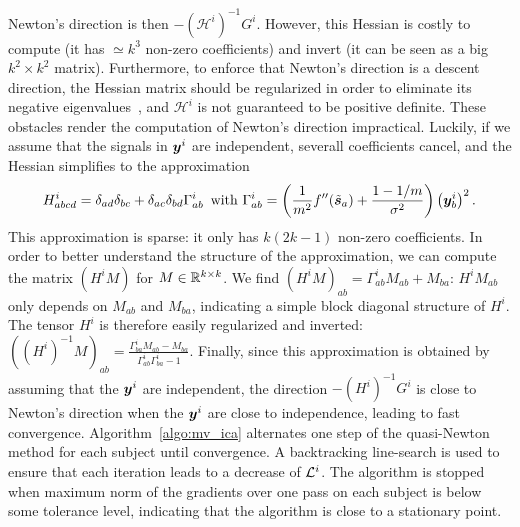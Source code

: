 Newton's direction is then $-\left(\mathcal{H}^i\right)^{-1}G^i$. However, this Hessian is costly to compute (it has $\simeq k^3$ non-zero coefficients) and invert (it can be seen as a big $k ^2\times k^2$ matrix). Furthermore, to enforce that Newton's direction is a descent direction, the Hessian matrix should be regularized in order to eliminate its negative eigenvalues~\cite{nocedal2006numerical}, and $\mathcal{H}^i$ is not guaranteed to be positive definite.
%
These obstacles render the computation of Newton's direction impractical.
%
Luckily, if we assume that the signals in $\boldsymbol{y}^i$ are independent, severall coefficients cancel, and the Hessian simplifies to the approximation
\begin{equation}
    \label{eq:hessian_approx}
    H^i_{abcd} = \delta_{ad}\delta_{bc} + \delta_{ac}\delta_{bd}\Gamma^i_{ab}\enspace \text{with  }\Gamma^i_{ab} = \left(\frac{1}{m^2}f''(\tilde{\boldsymbol{s}}_a) + \frac{1 - 1/m}{\sigma^2}\right)\left(\boldsymbol{y}^i_{b}\right)^2.
\end{equation}
This approximation is sparse: it only has $k(2k -1)$ non-zero coefficients.
%
In order to better understand the structure of the approximation, we can compute the matrix $\left(H^iM\right)$ for $M\in \mathbb{R}^{k\times k}$. 
%
We find $\left(H^iM\right)_{ab} = \Gamma^i_{ab}M_{ab} + M_{ba}$: $H^iM_{ab}$ only depends on $M_{ab}$ and $M_{ba}$, indicating a simple block diagonal structure of $H^i$.
%
The tensor $H^i$ is therefore easily regularized and inverted:
$\left((H^i)^{-1}M\right)_{ab} = \frac{\Gamma^i_{ba}M_{ab} - M_{ba}}{\Gamma^i_{ab}\Gamma^i_{ba} - 1}$.
%
Finally, since this approximation is obtained by assuming that the $\boldsymbol{y}^i$ are independent, the direction $-\left(H^i\right)^{-1}G^i$ is close to Newton's direction when the $\boldsymbol{y}^i$ are close to independence, leading to fast convergence.
%
Algorithm~\ref{algo:mv_ica} alternates one step of the quasi-Newton method for each subject until convergence.
%
A backtracking line-search is used to ensure that each iteration leads to a decrease of $\mathcal{L}^i$.
%
The algorithm is stopped when maximum norm of the gradients over one pass on each subject is below some tolerance level, indicating that the algorithm is close to a stationary point.

